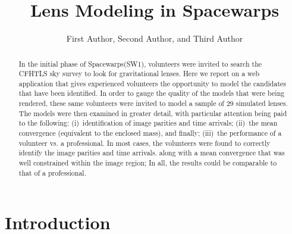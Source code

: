 \documentclass[12pt,preprint]{aastex}
\newcommand{\sw}{Spacewarps\xspace}
\begin{document}
\title{Lens Modeling in \sw}
\author{First Author,
Second Author, and
Third Author}

\begin{abstract}
In the initial phase of \sw (SW1), volunteers were invited to search the CFHTLS sky survey to look for gravitational lenses.
Here we report on a web application that gives experienced volunteers the opportunity to model the candidates that have been identified.
In order to gauge the quality of the models that were being rendered, these same volunteers were invited to model a sample of 29 simulated lenses.
The models were then examined in greater detail, with particular attention being paid to the following:
(i)~identification of image parities and time arrivals;
(ii)~the mean convergence (equivalent to the enclosed mass), and finally;
(iii)~the performance of a volunteer vs. a professional.
In most cases, the volunteers were found to correctly identify the image parities and time arrivals.
 along with a mean convergence that was well constrained within the image region;
In all, the results could be comparable to that of a professional.


\end{abstract}

\keywords{}
\section{Introduction}
\end{document}
